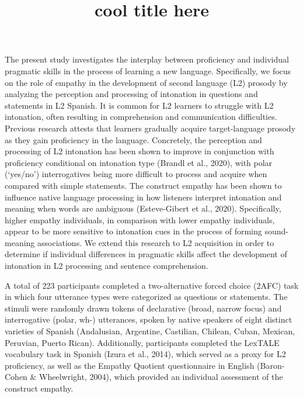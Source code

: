 \documentclass[
  11pt,
]{article}
\title{cool title here}
\author{}
\date{\vspace{-2.5em}}
\begin{document}
\maketitle

The present study investigates the interplay between proficiency and
individual pragmatic skills in the process of learning a new language.
Specifically, we focus on the role of empathy in the development of
second language (L2) prosody by analyzing the perception and processing
of intonation in questions and statements in L2 Spanish. It is common
for L2 learners to struggle with L2 intonation, often resulting in
comprehension and communication difficulties. Previous research attests
that learners gradually acquire target-language prosody as they gain
proficiency in the language. Concretely, the perception and processing
of L2 intonation has been shown to improve in conjunction with
proficiency conditional on intonation type (Brandl et al., 2020), with
polar (`yes/no') interrogatives being more difficult to process and
acquire when compared with simple statements. The construct empathy has
been shown to influence native language processing in how listeners
interpret intonation and meaning when words are ambiguous (Esteve-Gibert
et al., 2020). Specifically, higher empathy individuals, in comparison
with lower empathy individuals, appear to be more sensitive to
intonation cues in the process of forming sound-meaning associations. We
extend this research to L2 acquisition in order to determine if
individual differences in pragmatic skills affect the development of
intonation in L2 processing and sentence comprehension.

A total of 223 participants completed a two-alternative forced choice
(2AFC) task in which four utterance types were categorized as questions
or statements. The stimuli were randomly drawn tokens of declarative
(broad, narrow focus) and interrogative (polar, wh-) utterances, spoken
by native speakers of eight distinct varieties of Spanish (Andalusian,
Argentine, Castilian, Chilean, Cuban, Mexican, Peruvian, Puerto Rican).
Additionally, participants completed the LexTALE vocabulary task in
Spanish (Izura et al., 2014), which served as a proxy for L2
proficiency, as well as the Empathy Quotient questionnaire in English
(Baron-Cohen \& Wheelwright, 2004), which provided an individual
assessment of the construct empathy.
\end{document}

